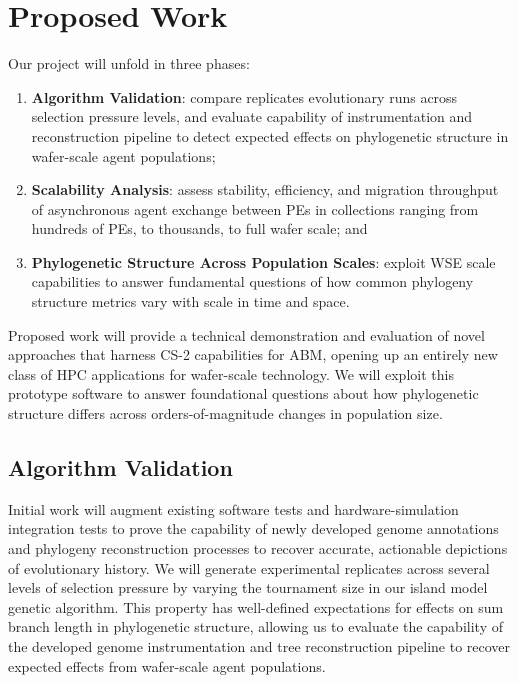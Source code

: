 \section{Proposed Work} \label{sec:objectives}

Our project will unfold in three phases:
\begin{enumerate}
\item \textbf{Algorithm Validation}: compare replicates evolutionary runs across selection pressure levels, and evaluate capability of instrumentation and reconstruction pipeline to detect expected effects on phylogenetic structure in wafer-scale agent populations;
\item \textbf{Scalability Analysis}: assess stability, efficiency, and migration throughput of asynchronous agent exchange between PEs in collections ranging from hundreds of PEs, to thousands, to full wafer scale; and
\item \textbf{Phylogenetic Structure Across Population Scales}: exploit WSE scale capabilities to answer fundamental questions of how common phylogeny structure metrics vary with scale in time and space.
\end{enumerate}

Proposed work will provide a technical demonstration and evaluation of novel approaches that harness CS-2 capabilities for ABM, opening up an entirely new class of HPC applications for wafer-scale technology.
We will exploit this prototype software to answer foundational questions about how phylogenetic structure differs across orders-of-magnitude changes in population size.

\subsection{Algorithm Validation}

Initial work will augment existing software tests and hardware-simulation integration tests to prove the capability of newly developed genome annotations and phylogeny reconstruction processes to recover accurate, actionable depictions of evolutionary history.
We will generate experimental replicates across several levels of selection pressure by varying the tournament size in our island model genetic algorithm.
This property has well-defined expectations for effects on sum branch length in phylogenetic structure, allowing us to evaluate the capability of the developed genome instrumentation and tree reconstruction pipeline to recover expected effects from wafer-scale agent populations.


